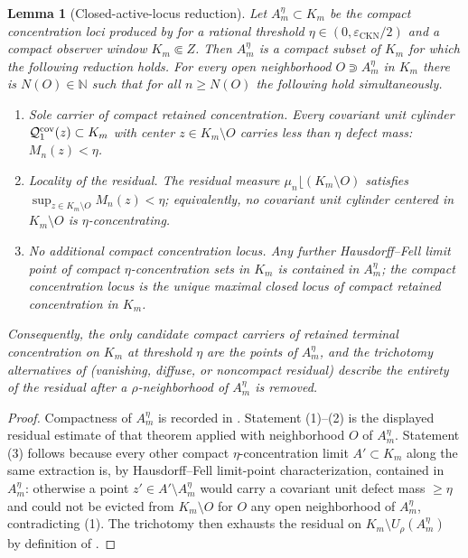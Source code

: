 \documentclass[11pt]{amsart}
\numberwithin{equation}{section}
\theoremstyle{plain}
\newtheorem{lemma}[lemma]{Lemma}
\theoremstyle{definition}
\theoremstyle{remark}
\newcommand{\eps}{\varepsilon}
\newcommand{\CKN}{\mathrm{CKN}}
\begin{document}
\begin{lemma}[Closed-active-locus reduction]
\label{lem:closed-active-locus-reduction}
Let \(A_m^\eta\subset K_m\) be the compact concentration loci produced by
 for a rational threshold
\(\eta\in(0,\eps_{\CKN}/2)\) and a compact observer window \(K_m\Subset Z\).
Then \(A_m^\eta\) is a compact subset of \(K_m\) for which the following
reduction holds.  For every open neighborhood \(O\Supset A_m^\eta\) in
\(K_m\) there is \(N(O)\in\mathbb N\) such that for all \(n\ge N(O)\) the
following hold simultaneously.
\begin{enumerate}[label=\textup{(\arabic*)}]
   \item \emph{Sole carrier of compact retained concentration.}  Every
   covariant unit cylinder
   \(\mathcal Q_1^{\rm cov}(z)\subset K_m\) with center \(z\in K_m\setminus O\)
   carries less than \(\eta\) defect mass:
   \(M_n(z)<\eta\).
   \item \emph{Locality of the residual.}  The residual measure
   \(\mu_n\lfloor (K_m\setminus O)\) satisfies
   \(\sup_{z\in K_m\setminus O} M_n(z)<\eta\); equivalently, no covariant unit
   cylinder centered in \(K_m\setminus O\) is \(\eta\)-concentrating.
   \item \emph{No additional compact concentration locus.}  Any further
   Hausdorff--Fell limit point of compact \(\eta\)-concentration sets in
   \(K_m\) is contained in \(A_m^\eta\); the compact concentration locus is
   the unique maximal closed locus of compact retained concentration in
   \(K_m\).
\end{enumerate}
Consequently, the only candidate compact carriers of retained terminal
concentration on \(K_m\) at threshold \(\eta\) are the points of \(A_m^\eta\),
and the trichotomy alternatives of
 (vanishing, diffuse, or
noncompact residual) describe the entirety of the residual after a
\(\rho\)-neighborhood of \(A_m^\eta\) is removed.
\end{lemma}

\begin{proof}
Compactness of \(A_m^\eta\) is recorded in
.  Statement \textup{(1)}--\textup{(2)} is
the displayed residual estimate of that theorem applied with neighborhood
\(O\) of \(A_m^\eta\).  Statement \textup{(3)} follows because every other
compact \(\eta\)-concentration limit \(A'\subset K_m\) along the same
extraction is, by Hausdorff--Fell limit-point characterization, contained in
\(A_m^\eta\): otherwise a point \(z'\in A'\setminus A_m^\eta\) would carry a
covariant unit defect mass \(\ge\eta\) and could not be evicted from
\(K_m\setminus O\) for \(O\) any open neighborhood of \(A_m^\eta\),
contradicting \textup{(1)}.  The trichotomy then exhausts the residual on
\(K_m\setminus U_\rho(A_m^\eta)\) by definition of
.
\end{proof}
\end{document}
